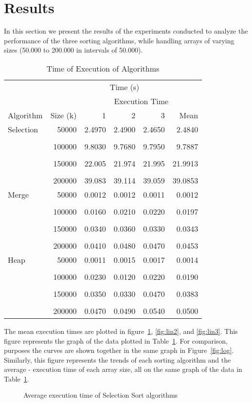 \documentclass[conference]{IEEEtran}
\providecommand{\tabularnewline}{\\}
\begin{document}
\section{Results}
In this section we present the results of the experiments conducted to analyze the performance of the three sorting algorithms, while handling arrays of varying sizes (50.000 to 200.000 in intervals of 50.000).
\begin{table}[H]
    \caption{Time of Execution of Algorithms\label{tab:tiempos}}
    \centering{}
    \begin{tabular}{lrrrrr}
        \toprule
        &  & \multicolumn{3}{c}{Time (s)}\tabularnewline
        \cmidrule{1-6}
        &  & \multicolumn{4}{c}{Execution Time}\tabularnewline
        \cmidrule{3-5}
        Algorithm & Size (k) & 1 & 2 & 3 & Mean\tabularnewline
        \midrule
        Selection & 50000 & 2.4970 & 2.4900 & 2.4650 & 2.4840 \tabularnewline
        \tabularnewline
        & 100000 & 9.8030 & 9.7680 & 9.7950 & 9.7887\tabularnewline
        \tabularnewline
        & 150000 & 22.005 & 21.974 & 21.995 & 21.9913\tabularnewline
        \tabularnewline
        & 200000 & 39.083 & 39.114 & 39.059 & 39.0853\tabularnewline
        \midrule
        Merge & 50000 & 0.0012 & 0.0012 & 0.0011 & 0.0012\tabularnewline
        \tabularnewline
        & 100000 & 0.0160 & 0.0210 & 0.0220 & 0.0197\tabularnewline
        \tabularnewline
        & 150000 & 0.0340 & 0.0360 & 0.0330 & 0.0343\tabularnewline
        \tabularnewline
        & 200000 & 0.0410 & 0.0480 & 0.0470 & 0.0453\tabularnewline
        \midrule
        Heap & 50000 & 0.0011 & 0.0015 & 0.0017 & 0.0014\tabularnewline
        \tabularnewline
        & 100000 & 0.0230 & 0.0120 & 0.0220 & 0.0190\tabularnewline
        \tabularnewline
        & 150000 & 0.0350 & 0.0330 & 0.0470 & 0.0383\tabularnewline
        \tabularnewline
        & 200000 & 0.0470 & 0.0490 & 0.0540 & 0.0500\tabularnewline
        \bottomrule
    \end{tabular}
\end{table}
\indent The mean execution times are plotted in figure~\ref{fig:lin1}, \ref{fig:lin2}, and \ref{fig:lin3}. This figure represents the graph of the data plotted in Table~\ref{tab:tiempos}. For comparison, purposes the curves are shown together in the same graph in Figure~\ref{fig:log}. Similarly, this figure represents the trends of each sorting algorithm and the average - execution time of each array size, all on the same graph of the data in Table~\ref{tab:tiempos}.
\begin{figure}[H]
    \centering
    \caption{Average execution time of Selection Sort algorithms \label{fig:lin1}}
\end{figure}
\end{document}
